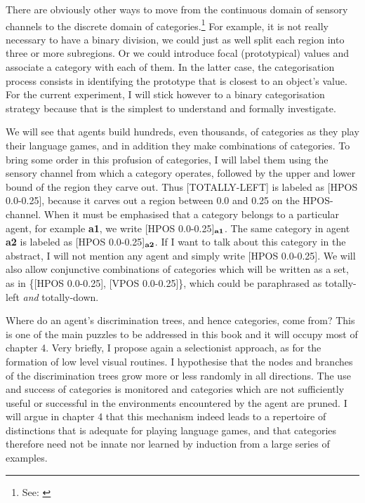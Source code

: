There are obviously other ways to 
move from the continuous domain of sensory channels to 
the discrete domain of categories.\footnote{
See: \cite{Taylor:1989}}
For example, it is not really necessary 
to have a binary division, we could just as well split 
each region into three or more subregions. Or we could introduce
focal (prototypical) values and associate
a category with each of them. In the latter case, 
the categorisation process consists 
in identifying the prototype that is closest to 
an object's value. For the current experiment, I will stick however
to a binary categorisation strategy because that is
the simplest to understand and formally investigate. 

We will see that agents build hundreds,
even thousands, of categories as they play their
language games, and in addition they make combinations of 
categories. To bring some order in this profusion of 
categories, I will label them using the 
sensory channel from which a category operates, 
followed by the upper and lower bound of the region they 
carve out. Thus [TOTALLY-LEFT]
is labeled as [HPOS 0.0-0.25], because it carves 
out a region between 0.0 and 0.25 on the HPOS-channel. 
When it must be emphasised that 
a category belongs to a particular agent, for example {\bf a1}, we
write [HPOS 0.0-0.25]$_{\bf a1}$. The same category in agent {\bf a2}
is labeled as [HPOS 0.0-0.25]$_{\bf a2}$. If I want to talk about 
this category in the abstract, I will not mention any 
agent and simply write [HPOS 0.0-0.25]. We will also 
allow conjunctive combinations of categories which will be
written as a set, as in \{[HPOS 0.0-0.25], [VPOS 0.0-0.25]\}, 
which could be paraphrased as totally-left {\it and}
totally-down.  

Where do an agent's discrimination trees, and hence
categories, come from? This is one of the main 
puzzles to be addressed in this book and it will 
occupy most of chapter 4. Very briefly, 
I propose again a selectionist approach, as for
the formation of low level visual routines. I hypothesise
that the nodes and branches of the discrimination trees
grow more or less randomly in all directions. The use and
success of categories is monitored and categories which 
are not sufficiently useful or successful in the environments
encountered by the agent are pruned. I will argue in chapter 4
that this mechanism indeed leads to 
a repertoire of distinctions that is adequate for 
playing language games, and that 
categories therefore need not be innate nor learned by 
induction from a large series of examples. 

